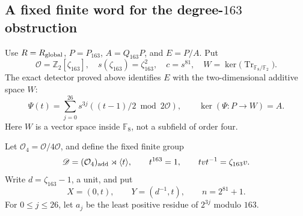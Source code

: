 \subsection{A fixed finite word for the degree-\(163\) obstruction}
\label{sec:163-finite-word}

Use \(R=R_{\rm global}\), \(P=P_{163}\), \(A=Q_{163}P\),
and \(E=P/A\). Put
\[
 \mathcal O=\mathbb Z_2[\zeta_{163}],\quad
 s(\zeta_{163})=\zeta_{163}^2,\quad c=s^{81},\quad
 W=\ker\bigl(\operatorname{Tr}_{\mathbb F_8/\mathbb F_2}\bigr).
\]
The exact detector proved above identifies \(E\) with the
two-dimensional additive space \(W\):
\begin{equation}
 \Psi(t)=\sum_{j=0}^{26}s^{3j}
             \left((t-1)/2\bmod2\mathcal O\right),\qquad
 \ker(\Psi:P\to W)=A.
 \label{eq:163-trace-detector}
\end{equation}
Here \(W\) is a vector space inside \(\mathbb F_8\), not a
subfield of order four.

Let \(\mathcal O_4=\mathcal O/4\mathcal O\), and define the fixed
finite group
\[
 \mathscr D=(\mathcal O_4)_{\rm add}\rtimes\langle t\rangle,
 \qquad t^{163}=1,\qquad tvt^{-1}=\zeta_{163}v.
\]
Write \(d=\zeta_{163}-1\), a unit, and put
\[
 X=(0,t),\qquad Y=(d^{-1},t),\qquad n=2^{81}+1.
\]
For \(0\leq j\leq26\), let \(a_j\) be the least positive residue
of \(2^{3j}\) modulo \(163\).

